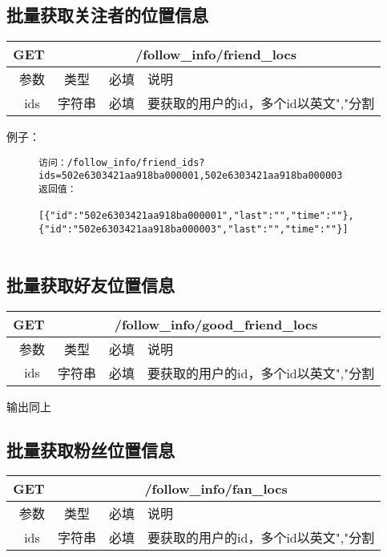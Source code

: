 \subsection{批量获取关注者的位置信息}
\begin{table}[H]
   \begin{center}
\begin{tabular}{|c|c|c|p{12cm}|}
\hline
GET & \multicolumn{3}{|c|}{/follow\_info/friend\_locs} \\
\hline\hline
 \  参数  & 类型 & 必填 &  说明  \\
\hline
 \  ids  & 字符串 & 必填 &  要获取的用户的id，多个id以英文","分割  \\
 \hline
\end{tabular}
   \end{center}
\end{table}


例子：

\begin{figure}[H]
\begin{verbatim}
访问：/follow_info/friend_ids?ids=502e6303421aa918ba000001,502e6303421aa918ba000003
返回值：

[{"id":"502e6303421aa918ba000001","last":"","time":""},
{"id":"502e6303421aa918ba000003","last":"","time":""}]


\end{verbatim}
\end{figure}

\subsection{批量获取好友位置信息}
\begin{table}[H]
   \begin{center}
\begin{tabular}{|c|c|c|p{12cm}|}
\hline
GET & \multicolumn{3}{|c|}{/follow\_info/good\_friend\_locs} \\
\hline\hline
 \  参数  & 类型 & 必填 &  说明  \\
\hline
 \  ids  & 字符串 & 必填 &  要获取的用户的id，多个id以英文","分割  \\
 \hline
\end{tabular}
   \end{center}
\end{table}

输出同上


\subsection{批量获取粉丝位置信息}
\begin{table}[H]
   \begin{center}
\begin{tabular}{|c|c|c|p{12cm}|}
\hline
GET & \multicolumn{3}{|c|}{/follow\_info/fan\_locs} \\
\hline\hline
 \  参数  & 类型 & 必填 &  说明  \\
\hline
 \  ids  & 字符串 & 必填 &  要获取的用户的id，多个id以英文","分割  \\
 \hline
\end{tabular}
   \end{center}
\end{table}

